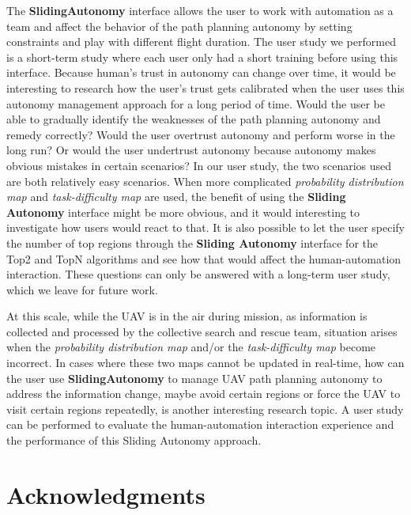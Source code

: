 \documentclass[journal]{IEEEtran}
\begin{document}
The \textbf{SlidingAutonomy} interface allows the user to work with automation as a team and affect the behavior of the path planning autonomy by setting constraints and play with different flight duration. The user study we performed is a short-term study where each user only had a short training before using this interface. Because human's trust in autonomy can change over time, it would be interesting to research how the user's trust gets calibrated when the user uses this autonomy management approach for a long period of time. Would the user be able to gradually identify the weaknesses of the path planning autonomy and remedy correctly? Would the user overtrust autonomy and perform worse in the long run? Or would the user undertrust autonomy because autonomy makes obvious mistakes in certain scenarios? In our user study, the two scenarios used are both relatively easy scenarios. When more complicated \textit{probability distribution map} and \textit{task-difficulty map} are used, the benefit of using the \textbf{Sliding Autonomy} interface might be more obvious, and it would interesting to investigate how users would react to that. It is also possible to let the user specify the number of top regions through the \textbf{Sliding Autonomy} interface for the Top2 and TopN algorithms and see how that would affect the human-automation interaction. These questions can only be answered with a long-term user study, which we leave for future work.

At this scale, while the UAV is in the air during mission, as information is collected and processed by the collective search and rescue team, situation arises when the \textit{probability distribution map} and/or the \textit{task-difficulty map} become incorrect. In cases where these two maps cannot be updated in real-time, how can the user use \textbf{SlidingAutonomy} to manage UAV path planning autonomy to address the information change, maybe avoid certain regions or force the UAV to visit certain regions repeatedly, is another interesting research topic. A user study can be performed to evaluate the human-automation interaction experience and the performance of this Sliding Autonomy approach.



\section*{Acknowledgments}
\end{document}
